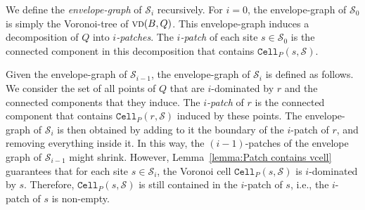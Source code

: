 \documentclass[a4paper, 11pt]{article}
\newcommand{\icell}[1][i]{${#1}$-patch\xspace}
\newcommand{\icells}[1][i]{${#1}$-patches\xspace}
\newcommand{\s}{\mathcal S}
\newcommand{\cell}[2][P]{\ensuremath{\mathtt{Cell}_{\scriptscriptstyle #1}(#2)}}
\newcommand{\vd}[2][P]{\textsc{vd}(#2, #1)}
\begin{document}
We define the \emph{envelope-graph} of $\s_i$ recursively. 
For $i = 0$, the envelope-graph of $\s_0$ is simply the Voronoi-tree of $\vd[Q]{B}$.
This envelope-graph induces a decomposition of $Q$ into \emph{\icells}.
The \emph{\icell} of each site $s\in \s_0$ is the connected component in this decomposition that contains $\cell{s, \s}$.

Given the envelope-graph of $\s_{i-1}$, the envelope-graph of $\s_i$ is defined as follows.
We consider the set of all points of $Q$ that are $i$-dominated by $r$ and the connected components that they induce. 
The \emph{\icell} of $r$ is the connected component that contains $\cell{r, \s}$ induced by these points.
The envelope-graph of $\s_i$ is then obtained by adding to it the boundary of the \icell of $r$, and removing everything inside it. 
In this way, the \icells[(i-1)] of the envelope graph of $\s_{i-1}$ might shrink. 
However, Lemma~\ref{lemma:Patch contains vcell} guarantees that for each site $s\in \s_i$, the Voronoi cell $\cell{s, \s}$ is $i$-dominated by $s$.
Therefore, $\cell{s, \s}$ is still contained in the \icell of $s$, i.e., the \icell of $s$ is non-empty.
\end{document}
